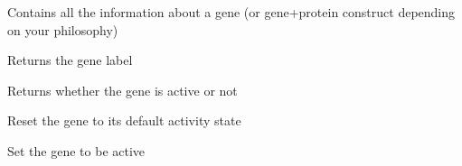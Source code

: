 \documentclass[letterpaper,10pt,english]{sphinxmanual}
\begin{document}
\begin{fulllineitems}
\label{\detokenize{modules_doc:cbmpy.CBModel.Gene}}
\pysigstartsignatures
{}
\pysigstopsignatures
\sphinxAtStartPar
Contains all the information about a gene (or gene+protein construct depending on your philosophy)

\begin{fulllineitems}
\label{\detokenize{modules_doc:cbmpy.CBModel.Gene.getLabel}}
\pysigstartsignatures
{}
\pysigstopsignatures
\sphinxAtStartPar
Returns the gene label

\end{fulllineitems}


\begin{fulllineitems}
\label{\detokenize{modules_doc:cbmpy.CBModel.Gene.isActive}}
\pysigstartsignatures
{}
\pysigstopsignatures
\sphinxAtStartPar
Returns whether the gene is active or not

\end{fulllineitems}


\begin{fulllineitems}
\label{\detokenize{modules_doc:cbmpy.CBModel.Gene.resetActivity}}
\pysigstartsignatures
{}
\pysigstopsignatures
\sphinxAtStartPar
Reset the gene to its default activity state

\end{fulllineitems}


\begin{fulllineitems}
\label{\detokenize{modules_doc:cbmpy.CBModel.Gene.setActive}}
\pysigstartsignatures
{}
\pysigstopsignatures
\sphinxAtStartPar
Set the gene to be active


\end{fulllineitems}
\end{fulllineitems}
\end{document}
